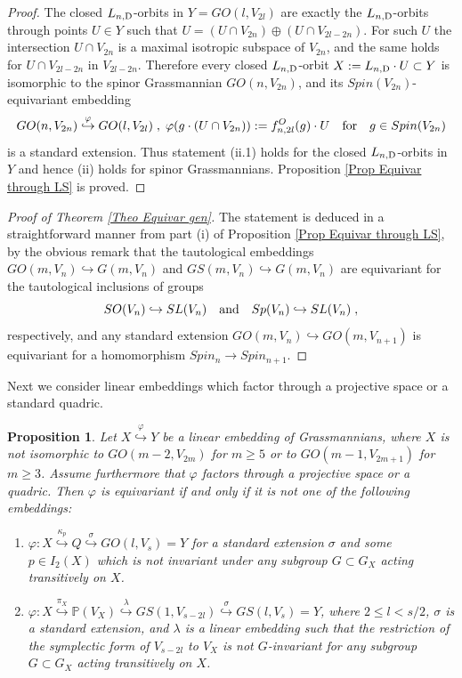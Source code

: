 \documentclass[12pt]{amsart}
\def\PP {{\mathbb P}}     %
\def\hw  {\hookrightarrow}
\newtheorem{prop}[theorem]{Proposition}
\begin{document}
\begin{proof}
The closed $L_{n,{\rm D}}$-orbits in $Y=GO(l,V_{2l})$ are exactly the $L_{n,{\rm D}}$-orbits through points $U\in Y$ such that $U=(U\cap V_{2n})\oplus (U\cap V_{2l-2n})$. For such $U$ the intersection $U\cap V_{2n}$ is a maximal isotropic subspace of $V_{2n}$, and the same holds for $U\cap V_{2l-2n}$ in $V_{2l-2n}$. Therefore every closed $L_{n,{\rm D}}$-orbit $X:=L_{n,{\rm D}}\cdot U\subset Y$ is isomorphic to the spinor Grassmannian $GO(n,V_{2n})$, and its $Spin(V_{2n})$-equivariant embedding
$$
GO(n,V_{2n}) \stackrel{\varphi}{\hookrightarrow} GO(l,V_{2l}) \;,\; \varphi(g\cdot (U\cap V_{2n})) := f^O_{n,2l}(g)\cdot U \quad {\rm for}\quad g\in Spin(V_{2n})
$$
is a standard extension. Thus statement (ii.1) holds for the closed $L_{n,{\rm D}}$-orbits in $Y$ and hence (ii) holds for spinor Grassmannians. Proposition \ref{Prop Equivar through LS} is proved.
\end{proof}


\begin{proof}[Proof of Theorem \ref{Theo Equivar gen}] The statement is deduced in a straightforward manner from part (i) of Proposition \ref{Prop Equivar through LS}, by the obvious remark that the tautological embeddings $GO(m,V_n)\hw G(m,V_n)$ and $GS(m,V_n)\hw G(m,V_n)$ are equivariant for the tautological inclusions of groups
$$
SO(V_n)\hw SL(V_n) \quad{\rm and}\quad Sp(V_n)\hw SL(V_n)\;,
$$
respectively, and any standard extension $GO(m,V_n)\hw GO(m,V_{n+1})$ is equivariant for a homomorphism $Spin_n\to Spin_{n+1}$.
\end{proof}


Next we consider linear embeddings which factor through a projective space or a standard quadric.

\begin{prop}\label{Prop Equivariance and exceptions}
Let $X\stackrel{\varphi}{\hookrightarrow} Y$ be a linear embedding of Grassmannians, where $X$ is not isomorphic to $GO(m-2,V_{2m})$ for $m\geq 5$ or to $GO(m-1,V_{2m+1})$ for $m\geq 3$. Assume furthermore that $\varphi$ factors through a projective space or a quadric. Then $\varphi$ is equivariant if and only if it is not one of the following embeddings:
\begin{enumerate}
\item[{\rm (a)}] $\varphi:X\stackrel{\kappa_p}{\hookrightarrow} Q \stackrel{\sigma}{\hookrightarrow} GO(l,V_s)=Y$ for a standard extension $\sigma$ and some $p\in I_2(X)$ which is not invariant under any subgroup $G\subset G_X$ acting transitively on $X$.
\item[{\rm (b)}] $\varphi:X\stackrel{\pi_X}{\hookrightarrow} \PP(V_X)\stackrel{\lambda}{\hookrightarrow} GS(1,V_{s-2l}) \stackrel{\sigma}{\hookrightarrow} GS(l,V_s)=Y$, where $2\leq l<s/2$, $\sigma$ is a standard extension, and $\lambda$ is a linear embedding such that the restriction of the symplectic form of $V_{s-2l}$ to $V_X$ is not $G$-invariant for any subgroup $G\subset G_X$ acting transitively on $X$.
\end{enumerate}
\end{prop}
\end{document}
